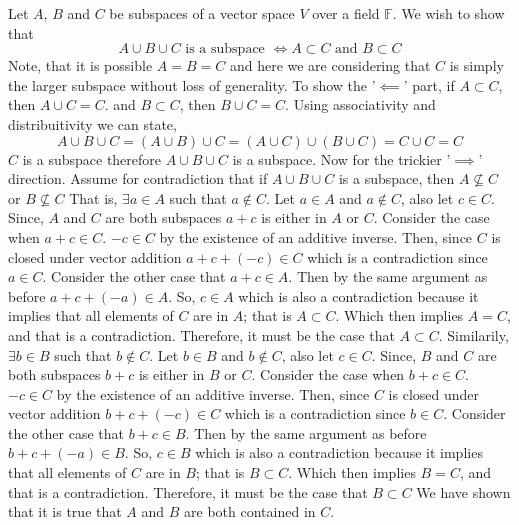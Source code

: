 \documentclass[10pt, twocolumn]{article}
\newcommand{\F}{\mathbb{F}}
\begin{document}
\begin{q}[Problem 13]
    Let $ A $, $ B $ and $ C $ be subspaces of a vector space $ V $ over a field $ \F $.
    We wish to show that 
    $$ A \cup B \cup C \text{ is a subspace } \iff A \subset C \text{ and } B \subset C $$
    Note, that it is possible $ A = B = C $ and here we are considering that $ C $ is simply the larger subspace without loss of generality. 
    To show the '$\impliedby$' part, if $ A \subset C $, then $ A \cup C = C $. 
    and $ B \subset C $, then $ B \cup C = C $. 
    Using associativity and distribuitivity we can state, 
    $$ A \cup B \cup C = (A \cup B) \cup C = (A \cup C) \cup (B \cup C) = C \cup C = C $$
    $ C $ is a subspace therefore $ A \cup B \cup C $ is a subspace.
    Now for the trickier '$\implies$' direction.
    Assume for contradiction that if $ A \cup B \cup C $ is a subspace, then $ A \not\subseteq C $ or $ B \not\subseteq C$
    That is, $ \exists a \in A $ such that $ a \not\in C $. 
    Let $ a \in A $ and $ a \not\in C $, also let $ c \in C $.  
    Since, $ A $ and $ C $ are both subspaces 
    $ a + c $ is either in $ A $ or $ C $. 
    Consider the case when $ a + c \in C $. 
    $ -c \in C $ by the existence of an additive inverse. 
    Then, since $ C $ is closed under vector addition 
    $ a + c + (-c) \in C $ which is a contradiction since $ a \in C $. 
    Consider the other case that $ a +c \in A $. Then by the same argument as before
    $ a + c + (-a) \in A $. So, $ c \in A $ which is also a contradiction because it implies that all elements of $ C $ are in $ A $; 
    that is $ A \subset C $. Which then implies $ A = C $, and that is a contradiction. 
    Therefore, it must be the case that $ A \subset C $.  
    Similarily, $ \exists b\in B $ such that $ b \not\in C $. 
    Let $ b \in B $ and $ b \not\in C $, also let $ c \in C $.  
    Since, $ B $ and $ C $ are both subspaces 
    $ b + c $ is either in $ B $ or $ C $. 
    Consider the case when $ b + c \in C $. 
    $ -c \in C $ by the existence of an additive inverse. 
    Then, since $ C $ is closed under vector addition 
    $ b + c + (-c) \in C $ which is a contradiction since $ b \in C $. 
    Consider the other case that $ b +c \in B $. Then by the same argument as before
    $ b + c + (-a) \in B $. So, $ c \in B $ which is also a contradiction because it implies that all elements of $ C $ are in $ B $; 
    that is $ B \subset C $. Which then implies $ B = C $, and that is a contradiction. 
    Therefore, it must be the case that $ B \subset C $
    We have shown that it is true that $ A $ and $ B $ are both contained in $ C $. 
\end{q}
\end{document}
